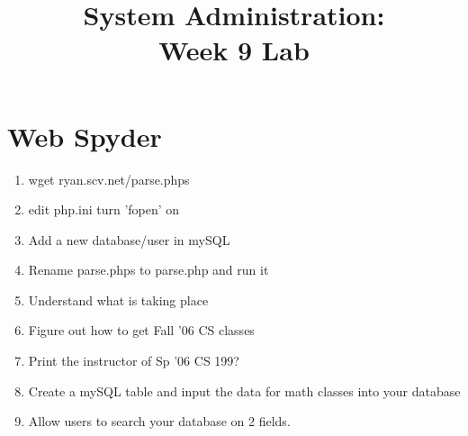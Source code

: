 \documentclass[10pt]{article}
\begin{document}
\title{System Administration:\\ Week 9 Lab}
\maketitle
\section{Web Spyder}
\begin{enumerate}
\item wget ryan.scv.net/parse.phps
\item edit php.ini turn 'fopen' on
\item Add a new database/user in mySQL
\item Rename parse.phps to parse.php and run it
\item Understand what is taking place
\item Figure out how to get Fall '06 CS classes
\item Print the instructor of Sp '06 CS 199?
\item Create a mySQL table and input the data for math classes into your database
\item Allow users to search your database on 2 fields.



\end{enumerate}
\end{document}
